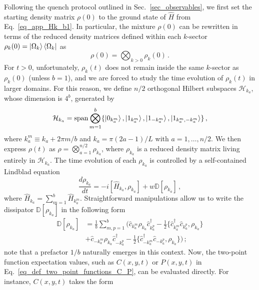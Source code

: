 Following the quench protocol outlined in Sec.~\ref{sec_observables}, we first set the starting density matrix $\rho(0)$ to the ground state of $\hat{H}$ from Eq.~\eqref{eq_app_Hk_b1}. In particular, the mixture $\rho(0)$ can be rewritten in terms of the reduced density matrices defined within each $k$-sector $\rho_k(0)=\ket{\Omega_k}\bra{\Omega_k}$ as
\begin{equation}
    \rho(0)=\bigotimes_{k>0}\rho_k(0)\,.
\end{equation}
For $t>0$, unfortunately, $\rho_k(t)$ does not remain inside the same $k$-sector as $\rho_k(0)$ (unless $b=1$), and we are forced to study the time evolution of $\rho_k(t)$ in larger domains. For this reason, we define $n/2$ orthogonal Hilbert subspaces $\mathcal{H}_{k_a}$, whose dimension is $4^b$, generated by
\begin{equation}
\mathcal{H}_{k_a}=\text{span}\bigotimes_{m=1}^b\{\ket{0_{k_{a}^m}}, \ket{1_{k_{a}^m}}, \ket{1_{-k_{a}^m}}, \ket{1_{k_{a}^m,-k_{a}^m}}\}\,,
\end{equation}
where $k^m_a\equiv k_a+2\pi m/b$ and $k_a=\pi(2a-1)/L$ with $a=1,\dots,n/2$. We then express $\rho(t)$ as $\rho=\bigotimes_{a=1}^{n/2}\rho_{k_a}$, where $\rho_{k_a}$ is a reduced density matrix living entirely in $\mathcal{H}_{k_a}$. The time evolution of each $\rho_{k_a}$ is controlled by a self-contained Lindblad equation
\begin{equation}
    \frac{d\rho_{k_a}}{dt}=-i[\hat{H}_{k_a},\rho_{k_a}]+w\mathbb{D}[\rho_{k_a}]\,,
\end{equation}
where $\hat{H}_{k_a}=\sum_{m=1}^b\hat{H}_{k^m_a}$. Straightforward manipulations allow us to write the dissipator $\mathbb{D}[\rho_{k_a}]$ in the following form
\begin{equation}
\begin{aligned}
    \mathbb{D}[\rho_{k_a}]&=\frac{1}{b}\sum_{m,p=1}^b\bigg(\hat{c}_{k_a^m}\rho_{k_a}\hat{c}^\dagger_{k_a^{p}}-\frac{1}{2}\{\hat{c}^\dagger_{k_a^m}\hat{c}_{k_a^{p}},\rho_{k_a}\}\\
    &+\hat{c}_{-{k_a^m}}\rho_{k_a}\hat{c}^\dagger_{-k_a^{p}}-\frac{1}{2}\{\hat{c}^\dagger_{-{k_a^m}}\hat{c}_{-k_a^{p}},\rho_{k_a}\}\bigg)\,;
    \label{eq_momentum_space_dissipation_1_over_b}
\end{aligned}
\end{equation}
note that a prefactor $1/b$ naturally emerges in this context. 
Now, the two-point function expectation values, such as $C(x,y,t)$ or $P(x, y, t)$ in Eq.~\eqref{eq_def_two_point_functions_C_P}, can be evaluated directly. For instance, $C(x,y,t)$ takes the form
